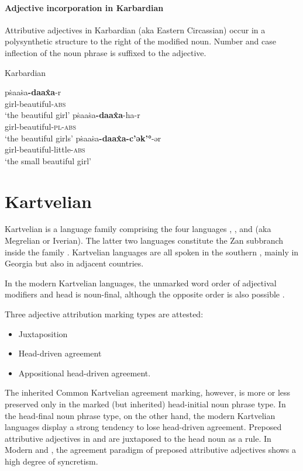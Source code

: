 \paragraph{Adjective incorporation in Karbardian}
Attributive adjectives in Karbardian (aka Eastern Circassian) occur in a polysynthetic structure to the right of the modified noun. Number and case inflection of the noun phrase is suffixed to the adjective.
\begin{exe}
\ex \rm{Karbardian \citep[295]{colarusso1989}}
\begin{xlist}
\ex	
\gll	pṡaaṡa\textbf{-daax̂a}-r\\
	girl-beautiful-\textsc{abs}\\
\glt	‘the beautiful girl’
\ex
\gll	pṡaaṡa\textbf{-daax̂a}-ha-r\\
	girl-beautiful-\textsc{pl}-\textsc{abs}\\
\glt	‘the beautiful girls’
\ex
\gll	pṡaaṡa\textbf{-daax̂a-c'ək'°}-ər\\
	girl-beautiful-little-\textsc{abs}\\
\glt	‘the small beautiful girl’
\end{xlist}
\end{exe}

\section{Kartvelian}\label{kartvelian synchr}
Kartvelian is a language family comprising the four languages , ,  and  (aka Megrelian or Iverian). The latter two languages constitute the Zan subbranch inside the family \cite[220]{salminen2007}. Kartvelian languages are all spoken in the southern , mainly in Georgia but also in adjacent countries.

In the modern Kartvelian languages, the unmarked word order of adjectival modifiers and head is noun-final, although the opposite order is also possible \citep[56]{harris1991a}.

Three adjective attribution marking types are attested:
\begin{itemize}
\item Juxtaposition
\item Head-driven agreement
\item Appositional head-driven agreement.
\end{itemize}
The inherited Common Kartvelian agreement marking, however, is more or less preserved only in the marked (but inherited) head-initial noun phrase type. In the head-final noun phrase type, on the other hand, the modern Kartvelian languages display a strong tendency to lose head-driven agreement. Preposed attributive adjectives in  and  are juxtaposed to the head noun as a rule. In Modern  and , the agreement paradigm of preposed attributive adjectives shows a high degree of syncretism.

